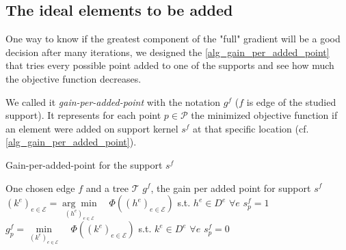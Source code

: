 \subsection{The ideal elements to be added}\label{sec_gain_per_added_point}

One way to know if the greatest component of the "full" gradient will be a good decision after many iterations, we designed the \cref{alg_gain_per_added_point} that tries every possible point added to one of the supports and see how much the objective function decreases.

We called it \emph{gain-per-added-point} with the notation $g^f$ ($f$ is edge of the studied support). It represents for each point $p \in \mathcal{P}$ the minimized objective function if an element were added on support kernel $s^f$ at that specific location (cf. \cref{alg_gain_per_added_point}).


\begin{algorithm}[!ht]
    \caption{Gain-per-added-point for the support $s^f$} \label{alg_gain_per_added_point}
  \begin{algorithmic}[0]
    \Input One chosen edge $f$ and a tree $\mathcal{T}$
    \Output $g^f$, the gain per added point for support $s^f$
    \State $(k^e)_{e \in \mathcal{E}} = \underset{(h^e)_{e \in \mathcal{E}}}{\arg\min} \quad \Phi ((h^e)_{e \in \mathcal{E}})$ \quad s.t. $h^e \in D^e$ \quad $\forall e$ 
    	\State $s^f_p = 1$ 
    	\State $g^f_p = \underset{(k^e)_{e \in \mathcal{E}}}{\min} \quad \Phi ((k^e)_{e \in \mathcal{E}})$ \quad s.t. $k^e \in D^e$ \quad $\forall e$
    	\State $s^f_p = 0$ 
    \EndFor
  \end{algorithmic}
\end{algorithm}


